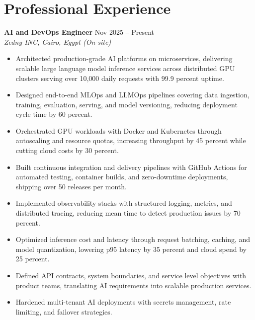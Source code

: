 \documentclass[10pt,letterpaper]{article}
\begin{document}
\section{Professional Experience}

\textbf{AI and DevOps Engineer} \hfill Nov 2025 -- Present\\
\textit{Zedny INC, Cairo, Egypt (On-site)}
\begin{itemize}
\item Architected production-grade AI platforms on microservices, delivering scalable large language model inference services across distributed GPU clusters serving over 10,000 daily requests with 99.9 percent uptime.
\item Designed end-to-end MLOps and LLMOps pipelines covering data ingestion, training, evaluation, serving, and model versioning, reducing deployment cycle time by 60 percent.
\item Orchestrated GPU workloads with Docker and Kubernetes through autoscaling and resource quotas, increasing throughput by 45 percent while cutting cloud costs by 30 percent.
\item Built continuous integration and delivery pipelines with GitHub Actions for automated testing, container builds, and zero-downtime deployments, shipping over 50 releases per month.
\item Implemented observability stacks with structured logging, metrics, and distributed tracing, reducing mean time to detect production issues by 70 percent.
\item Optimized inference cost and latency through request batching, caching, and model quantization, lowering p95 latency by 35 percent and cloud spend by 25 percent.
\item Defined API contracts, system boundaries, and service level objectives with product teams, translating AI requirements into scalable production services.
\item Hardened multi-tenant AI deployments with secrets management, rate limiting, and failover strategies.
\end{itemize}
\end{document}
